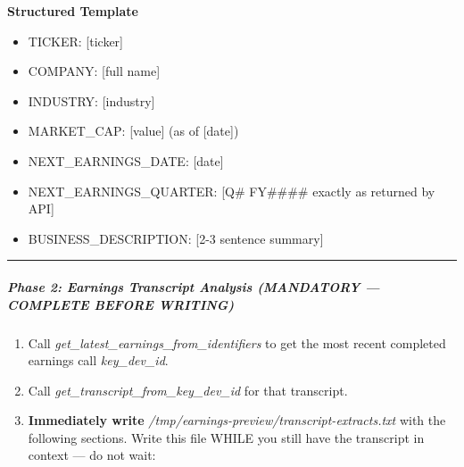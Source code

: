 \documentclass[11pt]{article}
\begin{document}
\textbf{Structured Template}
\begin{itemize}[leftmargin=*,itemsep=2pt,topsep=2pt]
\item {} TICKER: [ticker]
\item {} COMPANY: [full name]
\item {} INDUSTRY: [industry]
\item {} MARKET\_\allowbreak{}CAP: [value] (as of [date])
\item {} NEXT\_\allowbreak{}EARNINGS\_\allowbreak{}DATE: [date]
\item {} NEXT\_\allowbreak{}EARNINGS\_\allowbreak{}QUARTER: [Q\# FY\#\#\#\# exactly as returned by API]
\item {} BUSINESS\_\allowbreak{}DESCRIPTION: [2-3 sentence summary]
\end{itemize}

\vspace{0.5em}\hrule\vspace{0.5em}

\subparagraph{Phase 2: Earnings Transcript Analysis (MANDATORY — COMPLETE BEFORE WRITING)}\mbox{}\par

\begin{enumerate}[leftmargin=*,itemsep=2pt,topsep=2pt]
\item {} Call \emph{get\_\allowbreak{}latest\_\allowbreak{}earnings\_\allowbreak{}from\_\allowbreak{}identifiers} to get the most recent completed earnings call \emph{key\_\allowbreak{}dev\_\allowbreak{}id}.
\item {} Call \emph{get\_\allowbreak{}transcript\_\allowbreak{}from\_\allowbreak{}key\_\allowbreak{}dev\_\allowbreak{}id} for that transcript.
\item {} \textbf{Immediately write} \emph{/tmp/earnings-preview/transcript-extracts.txt} with the following sections. Write this file WHILE you still have the transcript in context — do not wait:
\end{enumerate}
\end{document}
